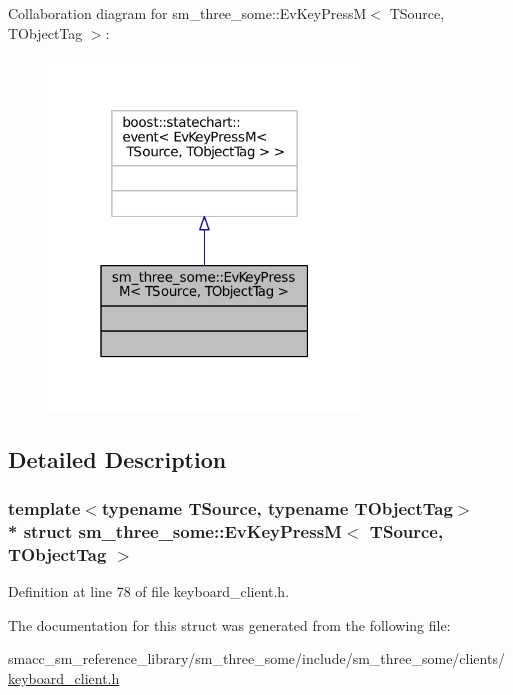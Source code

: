 Collaboration diagram for sm\+\_\+three\+\_\+some\+:\+:Ev\+Key\+PressM$<$ T\+Source, T\+Object\+Tag $>$\+:
\nopagebreak
\begin{figure}[H]
\begin{center}
\leavevmode
\includegraphics[width=235pt]{structsm__three__some_1_1EvKeyPressM__coll__graph}
\end{center}
\end{figure}


\subsection{Detailed Description}
\subsubsection*{template$<$typename T\+Source, typename T\+Object\+Tag$>$\\*
struct sm\+\_\+three\+\_\+some\+::\+Ev\+Key\+Press\+M$<$ T\+Source, T\+Object\+Tag $>$}



Definition at line 78 of file keyboard\+\_\+client.\+h.



The documentation for this struct was generated from the following file\+:\begin{DoxyCompactItemize}
\item 
smacc\+\_\+sm\+\_\+reference\+\_\+library/sm\+\_\+three\+\_\+some/include/sm\+\_\+three\+\_\+some/clients/\hyperlink{keyboard__client_8h}{keyboard\+\_\+client.\+h}\end{DoxyCompactItemize}
